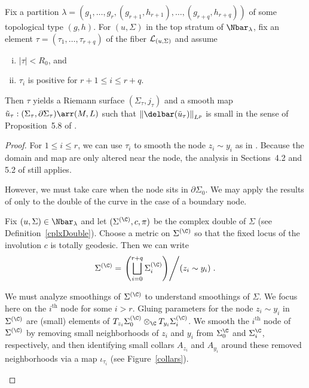\begin{lemma} \label{glue}
Fix a partition $\lambda=(g_1,\ldots,g_r,(g_{r+1},h_{r+1}),\ldots,(g_{r+q},h_{r+q}))$ of some topological type $(g,h)$. For $(u,\Sigma)$ in the top stratum of $\Nbar_\lambda$, fix an element $\tau=(\tau_1,\ldots,\tau_{r+q})$ of the fiber $\mathcal{L}_{(u,\Sigma)}$ and assume
\begin{enumerate}[(i)]
\item $|\tau|<R_0$, and
\item $\tau_i$ is positive for $r+1 \leq i \leq r+q$.
\end{enumerate}
Then $\tau$ yields a Riemann surface $(\Sigma_\tau,j_\tau)$ and a smooth map $\tilde{u}_\tau:(\Sigma_\tau,\partial\Sigma_\tau) \arr (M,L)$ such that $\norm{\delbar(\tilde{u}_\tau)}_{L^p}$ is small in the sense of Proposition~5.8 of \cite{dw}.
\begin{proof}
For $1 \leq i \leq r$, we can use $\tau_i$ to smooth the node $z_i \sim y_i$ as in \cite{dw}. Because the domain and map are only altered near the node, the analysis in Sections~4.2 and 5.2 of \cite{dw} still applies.

However, we must take care when the node sits in $\partial\Sigma_0$. We may apply the results of \cite{dw} only to the double of the curve in the case of a boundary node.

Fix $(u,\Sigma) \in \Nbar_\lambda$ and let $(\Sigma^{(\C)},c,\pi)$ be the complex double of $\Sigma$ (see Definition~\ref{cplxDouble}). Choose a metric on $\Sigma^{(\C)}$ so that the fixed locus of the involution $c$ is totally geodesic. Then we can write
\[
\Sigma^{(\C)} = \left. \left( \bigsqcup\limits_{i=0}^{r+q} \Sigma_i^{(\C)} \right) \middle/ \left( z_i \sim y_i \right) \right. .
\]

We must analyze smoothings of $\Sigma^{(\C)}$ to understand smoothings of $\Sigma$. We focus here on the $i^{\text{th}}$ node for some $i>r$. Gluing parameters for the node $z_i \sim y_i$ in $\Sigma^{(\C)}$ are (small) elements of $T_{z_i}\Sigma_0^{(\C)} \otimes_\C T_{y_i}\Sigma_i^{(\C)}$. We smooth the $i^{\text{th}}$ node of $\Sigma^{(\C)}$ by removing small neighborhoods of $z_i$ and $y_i$ from $\Sigma_0^{\C}$ and $\Sigma_i^{\C}$, respectively, and then identifying small collars $A_{z_i}$ and $A_{y_i}$ around these removed neighborhoods via a map $\iota_{\tau_i}$ (see Figure~\ref{collars}).
\begin{figure}[ht]
\centering
{}
\end{figure}
\end{proof}
\end{lemma}
